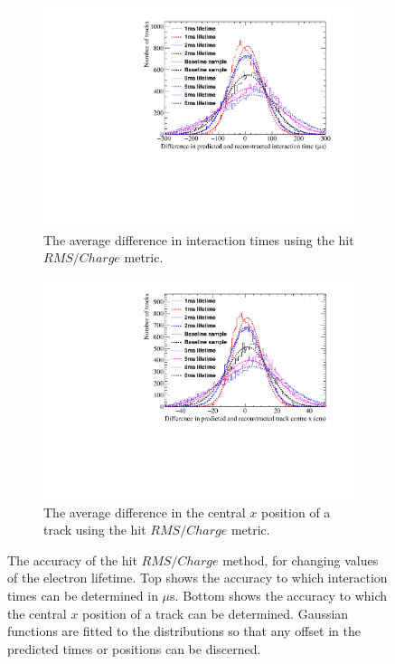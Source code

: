 \begin{figure}[h!]
  \centering
  \begin{subfigure}{0.6\textwidth}
    \centering
    \includegraphics[width=\textwidth]{Canvas_AvDiff_T_RMS_Q_ElecLifetime}
    \caption{The average difference in interaction times using the hit $RMS/Charge$ metric.}
    \label{fig:DiffLifeStudy_AvDiff_RMS_Int_T}
  \end{subfigure}
  \begin{subfigure}{0.6\textwidth}
    \centering
    \includegraphics[width=\textwidth]{Canvas_AvDiff_X_RMS_Q_ElecLifetime}
    \caption{The average difference in the central $x$ position of a track using the hit $RMS/Charge$ metric.}
    \label{fig:DiffLifeStudy_AvDiff_RMS_Int_X}
  \end{subfigure}
  \caption[Comparing the accuracy of the hit $RMS$ method, as the electron lifetime changes]
          {The accuracy of the hit $RMS/Charge$ method, for changing values of the electron lifetime. Top shows the accuracy to which interaction times can be determined in $\mu$s. Bottom shows the accuracy to which the central $x$ position of a track can be determined. Gaussian functions are fitted to the distributions so that any offset in the predicted times or positions can be discerned.}
  \label{fig:DiffLifeStudy_AvDiff_RMS_Int}
\end{figure}

